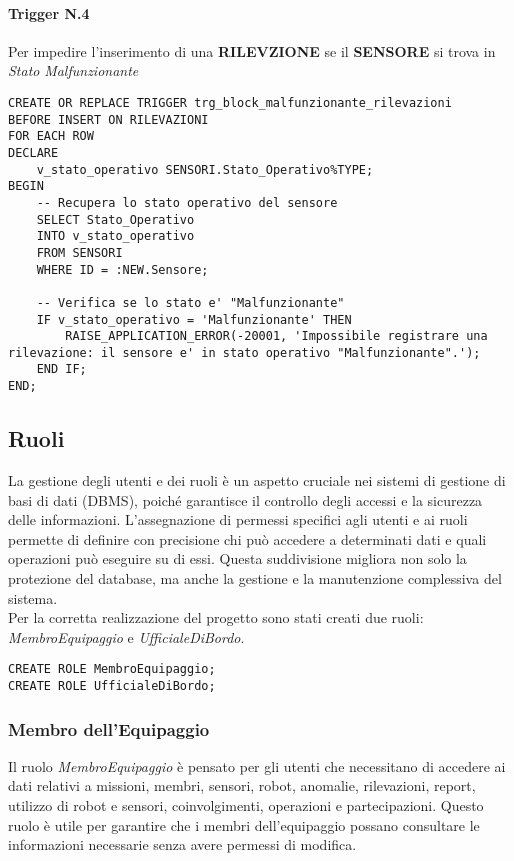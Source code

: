 \paragraph{Trigger N.4} Per impedire l'inserimento di una \textbf{RILEVZIONE} se il \textbf{SENSORE} si trova in \textit{Stato} \textit{Malfunzionante}
\begin{lstlisting}
CREATE OR REPLACE TRIGGER trg_block_malfunzionante_rilevazioni
BEFORE INSERT ON RILEVAZIONI
FOR EACH ROW
DECLARE
    v_stato_operativo SENSORI.Stato_Operativo%TYPE;
BEGIN
    -- Recupera lo stato operativo del sensore
    SELECT Stato_Operativo
    INTO v_stato_operativo
    FROM SENSORI
    WHERE ID = :NEW.Sensore;

    -- Verifica se lo stato e' "Malfunzionante"
    IF v_stato_operativo = 'Malfunzionante' THEN
        RAISE_APPLICATION_ERROR(-20001, 'Impossibile registrare una rilevazione: il sensore e' in stato operativo "Malfunzionante".');
    END IF;
END;
\end{lstlisting}

\subsection{Ruoli}
\label{ruoli}
La gestione degli utenti e dei ruoli è un aspetto cruciale nei sistemi di gestione di basi di dati (DBMS), poiché garantisce il controllo degli accessi e la sicurezza delle informazioni. L'assegnazione di permessi specifici agli utenti e ai ruoli permette di definire con precisione chi può accedere a determinati dati e quali operazioni può eseguire su di essi. Questa suddivisione migliora non solo la protezione del database, ma anche la gestione e la manutenzione complessiva del sistema. \\

\noindent
Per la corretta realizzazione del progetto sono stati creati due ruoli: \textit{MembroEquipaggio} e \textit{UfficialeDiBordo}.
\begin{lstlisting}
CREATE ROLE MembroEquipaggio;
CREATE ROLE UfficialeDiBordo;
\end{lstlisting}

\subsubsection{Membro dell'Equipaggio}
Il ruolo \textit{MembroEquipaggio} è pensato per gli utenti che necessitano di accedere ai dati relativi a missioni, membri, sensori, robot, anomalie, rilevazioni, report, utilizzo di robot e sensori, coinvolgimenti, operazioni e partecipazioni.
Questo ruolo è utile per garantire che i membri dell'equipaggio possano consultare le informazioni necessarie senza avere permessi di modifica.

